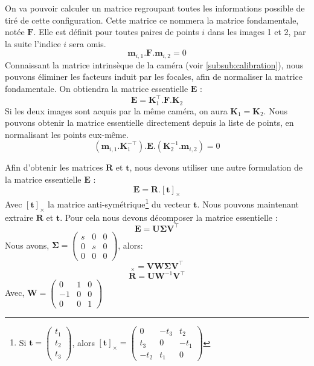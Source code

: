 On va pouvoir calculer un matrice regroupant toutes les informations possible de tiré de cette configuration.
Cette matrice ce nommera la matrice fondamentale, notée $\mathbf{F}$.
Elle est définit pour toutes paires de points $i$ dans les images 1 et 2, par la suite l'indice $i$ sera omis.
\begin{equation}
\mathbf{m}_{i,1}.\mathbf{F}.\mathbf{m}_{i,2} = 0
\label{eq:fondamentale}
\end{equation}
Connaissant la matrice intrinsèque de la caméra (voir \ref{subsub:calibration}), nous pouvons éliminer les facteurs induit par les focales, afin de normaliser la matrice fondamentale.
On obtiendra la matrice essentielle $\mathbf{E}$ :
\begin{equation}
\mathbf{E} = \mathbf{K}_1^{\top} . \mathbf{F} . \mathbf{K}_2
\end{equation}
Si les deux images sont acquis par la même caméra, on aura $\mathbf{K}_1 = \mathbf{K}_2$.
Nous pouvons obtenir la matrice essentielle directement depuis la liste de points, en normalisant les points eux-même.
\begin{equation}
(\mathbf{m}_{i,1}.\mathbf{K}_1^{-\top}).\mathbf{E}.(\mathbf{K}_2^{-1}.\mathbf{m}_{i,2}) = 0
\label{eq:essentielle}
\end{equation}


Afin d'obtenir les matrices $\mathbf{R}$ et $\mathbf{t}$, nous devons utiliser une autre formulation de la matrice essentielle $\mathbf{E}$ :
\begin{equation}
\mathbf{E} = \mathbf{R} . [\mathbf{t}]_\times
\end{equation}
Avec $[\mathbf{t}]_\times$ la matrice anti-symétrique\footnote{Si $\mathbf{t}=\begin{pmatrix}t_1\\t_2\\t_3\end{pmatrix}$, alors $[\mathbf{t}]_\times=\begin{pmatrix}0&-t_3&t_2\\t_3&0&-t_1\\-t_2&t_1&0\end{pmatrix}$} du vecteur $\mathbf{t}$.
Nous pouvons maintenant extraire $\mathbf{R}$ et $\mathbf{t}$. Pour cela nous devons décomposer la matrice essentielle :
$$\mathbf{E}=\mathbf{U} \mathbf{\Sigma} \mathbf{V}^{\top}$$
Nous avons, $\mathbf{\Sigma} = \begin{pmatrix}s&0&0\\0&s&0\\0&0&0\end{pmatrix}$, alors:
\begin{equation}
[\mathbf{t}]_\times = \mathbf{V} \mathbf{W} \mathbf{\Sigma} \mathbf{V}^{\top}
\end{equation}
\begin{equation}
\mathbf{R} = \mathbf{U} \mathbf{W}^{-1} \mathbf{V}^{\top}
\end{equation}
Avec, $\mathbf{W}=\begin{pmatrix}0&1&0\\-1&0&0\\0&0&1\end{pmatrix}$




